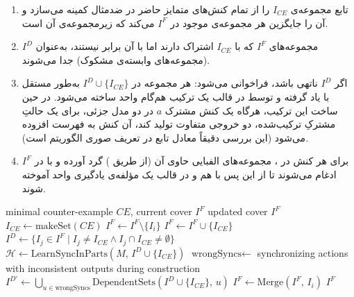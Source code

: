 \documentclass[a4paper,12pt]{article}
\numberwithin{algorithm}{section}
\begin{document}
\begin{enumerate}
	\item تابع  مجموعه‌ی $I_{CE}$ را از تمام کنش‌های متمایز حاضر در ضدمثال کمینه می‌سازد و آن را جایگزین هر مجموعه‌ی موجود در $I^F$ می‌کند که زیرمجموعه‌ی آن است.
	\item مجموعه‌های $I^F$ که با $I_{CE}$ اشتراک دارند اما با آن برابر نیستند، به‌عنوان $I^D$ (مجموعه‌های وابسته‌ی مشکوک) جدا می‌شوند.
	\item اگر $I^D$ ناتهی باشد،  فراخوانی می‌شود: هر مجموعه در $I^D\cup\{I_{CE}\}$ به‌طور مستقل با  یاد گرفته و توسط  در قالب یک ترکیب هم‌گام واحد ساخته می‌شود. در حین ساخت این ترکیب، هرگاه یک کنش مشترک $a$ در دو مدل جزئی، برای یک حالتِ مشترکِ ترکیب‌شده، دو خروجی متفاوت تولید کند، آن کنش به فهرست  افزوده می‌شود (این بررسی دقیقاً معادل تابع  در تعریف صوری الگوریتم است).
	\item برای هر کنش در ، مجموعه‌های الفبایی حاوی آن (از طریق ) گرد آورده و با  در $I^F$ ادغام می‌شوند تا از این پس با هم و در قالب یک مؤلفه‌ی یادگیری واحد آموخته شوند.
\end{enumerate}

\begin{algorithm}[H]
\caption{}
\label{alg:processce}
\begin{latin}
\begin{algorithmic}[1]
\REQUIRE minimal counter-example $CE$, current cover $I^F$
\ENSURE updated cover $I^F$
\STATE $I_{CE} \leftarrow \text{makeSet}(CE)$
    \STATE $I^F \leftarrow I^F \setminus \{I_i\}$
\ENDIF
\STATE $I^F \leftarrow I^F \cup \{I_{CE}\}$
\STATE $I^D \leftarrow \{I_j \in I^F \mid I_j \neq I_{CE} \wedge I_j \cap I_{CE} \neq \emptyset\}$
    \STATE $\mathcal{H} \leftarrow \text{LearnSyncInParts}(M,\, I^D \cup \{I_{CE}\})$ 
    \STATE $\text{wrongSyncs} \leftarrow$ synchronizing actions with inconsistent outputs during  construction
    \STATE $I^{D'} \leftarrow \bigcup_{u \in \text{wrongSyncs}} \text{DependentSets}(I^D \cup \{I_{CE}\},\, u)$
        \STATE $I^F \leftarrow \text{Merge}(I^F,\, I_i)$
    \ENDFOR
\ENDIF
\RETURN $I^F$
\end{algorithmic}
\end{latin}
\end{algorithm}
\end{document}
